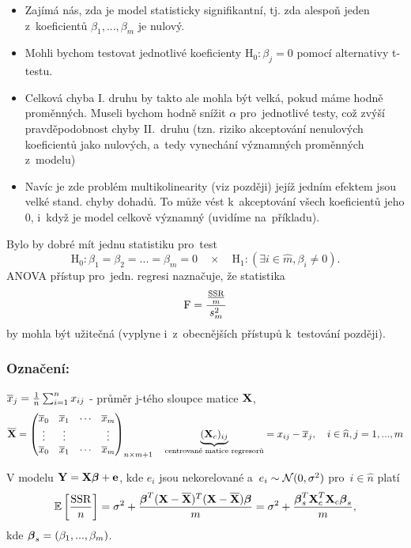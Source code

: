 \begin{itemize}
\item Zajímá nás, zda je model statisticky signifikantní, tj. zda alespoň jeden z~koeficientů $\beta_1,..., \beta_m$ je nulový.
\item Mohli bychom testovat jednotlivé koeficienty $\text{H}_0 : \beta_j = 0$ pomocí alternativy t-testu.
\item Celková chyba I. druhu by takto ale mohla být velká, pokud máme hodně proměnných. Museli bychom hodně snížit $\alpha$ pro~jednotlivé testy, což zvýší pravděpodobnost chyby II.~druhu (tzn. riziko akceptování nenulových koeficientů jako nulových, a~tedy vynechání významných proměnných z~modelu)
\item Navíc je zde problém multikolinearity (viz později) jejíž jedním efektem jsou velké stand. chyby dohadů. To může vést k~akceptování všech koeficientů jeho 0, i~když je model celkově významný (uvidíme na~příkladu).
\end{itemize}

Bylo by dobré mít jednu statistiku pro~test
 $$
\text{H}_0 : \beta_1 = \beta_2 = ... = \beta_m = 0 \quad \times \quad \text{H}_1 : (\exists i\in \widehat{m}, \beta_i \neq 0).
 $$
ANOVA přístup pro~jedn. regresi naznačuje, že statistika
 $$
\text{F} = \frac{\frac{\mathrm{SSR}}{m}}{s_m^2}
 $$
by mohla být užitečná (vyplyne i~z~obecnějších přístupů k~testování později).

\subsubsection*{Označení:}
 $\overline{x}_j = \frac{1}{n} \sum_{i = 1}^n x_{ij}$ - průměr j-tého sloupce matice $\textbf{X}$,
 $$
	\overline{\textbf{X}} = \begin{pmatrix}
	\overline{x}_0 & \overline{x}_1 & \cdots & \overline{x}_m \\
	\vdots & \vdots & & \vdots \\
	\overline{x}_0 & \overline{x}_1 & \cdots & \overline{x}_m
	\end{pmatrix}_{n \times m+1} \quad \underbrace{(\textbf{X}_c)_{ij}}_{\text{centrované matice regresorů}} = x_{ij} - \overline{x}_j, \quad i\in\widehat{n}, j = 1,..., m
 $$

\begin{theorem}
	V modelu $\textbf{Y} = \textbf{X} \boldsymbol{\beta} + \textbf{e}$, kde $e_i$ jsou nekorelované a~$e_i \sim \mathcal{N}(0,\sigma^2)$ pro~$i  \in\widehat{n} $ platí
	 $$
		\mathbb{E} \left[\frac{\mathrm{SSR}}{n} \right] = \sigma^2 + \frac{\boldsymbol{\beta}^T(\textbf{X} - \overline{\textbf{X}})^T(\textbf{X} - \overline{\textbf{X}}) \boldsymbol{\beta}}{m} = \sigma^2 + \frac{\boldsymbol{\beta}_s^T \textbf{X}_c^T \textbf{X}_c \boldsymbol{\beta}_s}{m},
	 $$
	kde $\boldsymbol{\beta}_s = (\beta_1,..., \beta_m)$.
\end{theorem}

